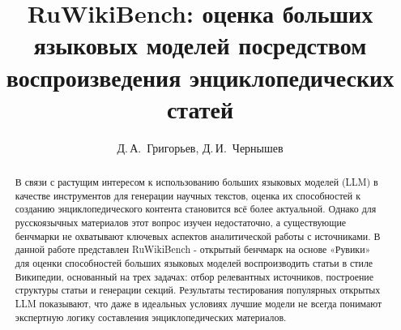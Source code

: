 \documentclass{article}
\begin{document}
\raggedbottom
{}


\title{RuWikiBench: оценка больших языковых моделей посредством воспроизведения энциклопедических статей}

\author{Д.\,А.~Григорьев\Addressmark[1]\Emailmark[1], Д.\,И.~Чернышев\Addressmark[1]\Emailmark[2]}










\maketitle

\begin{abstract}
В связи с растущим интересом к использованию больших языковых моделей (LLM) в качестве инструментов для генерации научных текстов, 
оценка их способностей к созданию энциклопедического контента становится всё более актуальной.
Однако для русскоязычных материалов этот вопрос изучен недостаточно, а существующие бенчмарки не охватывают ключевых аспектов аналитической работы с источниками.
В данной работе представлен RuWikiBench - открытый бенчмарк на основе «Рувики» для оценки способностей больших языковых моделей воспроизводить статьи в стиле Википедии, 
основанный на трех задачах:
отбор релевантных источников, построение структуры статьи и генерации секций.
Результаты тестирования популярных открытых LLM показывают, что даже в идеальных условиях лучшие модели не всегда понимают экспертную логику составления энциклопедических материалов. 
\end{abstract}
\end{document}
